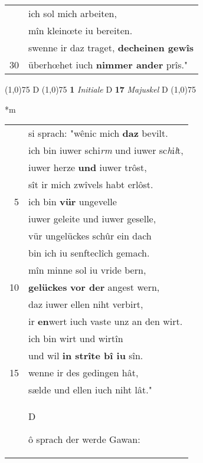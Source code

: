 \documentclass[8pt,a4paper,notitlepage]{article}
\begin{document}
\begin{table}[ht]
\begin{minipage}[t]{0.5\linewidth}
\begin{tabular}{rl}
 & ich sol mich arbeiten,\\ 
 & mîn kleinœte iu bereiten.\\ 
 & swenne ir daz traget, \textbf{decheinen gewîs}\\ 
30 & überhœhet iuch \textbf{nimmer ander} prîs."\\ 
\end{tabular}
\scriptsize
\line(1,0){75} \newline
D \newline
\line(1,0){75} \newline
\textbf{1} \textit{Initiale} D  \textbf{17} \textit{Majuskel} D  \newline
\line(1,0){75} \newline
\newline
\end{minipage}
\hspace{0.5cm}
\begin{minipage}[t]{0.5\linewidth}
\small
\begin{center}*m
\end{center}
\begin{tabular}{rl}
 & si sprach: "wênic mich \textbf{daz} bevilt.\\ 
 & ich bin iuwer schi\textit{rm} und iuwer sc\textit{h}i\textit{l}t,\\ 
 & iuwer herze \textbf{und} iuwer trôst,\\ 
 & sît ir mich zwîvels habt erlôst.\\ 
5 & ich bin \textbf{vür} ungevelle\\ 
 & iuwer geleite und iuwer geselle,\\ 
 & vür ungelückes schûr ein dach\\ 
 & bin ich iu senfteclîch gemach.\\ 
 & mîn minne sol iu vride bern,\\ 
10 & \textbf{gelückes} \textbf{vor der} angest wern,\\ 
 & daz iuwer ellen niht verbirt,\\ 
 & ir \textbf{en}wert iuch vaste unz an den wirt.\\ 
 & ich bin wirt und wirtîn\\ 
 & und wil \textbf{in strîte bî iu} sîn.\\ 
15 & wenne ir des gedingen hât,\\ 
 & sælde und ellen iuch niht lât."\\ 
 & \begin{large}D\end{large}ô sprach der werde Gawan:\\ 

\end{tabular}
\end{minipage}
\end{table}
\end{document}

